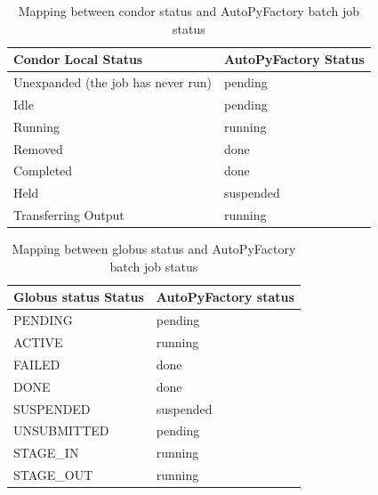 \documentclass[a4paper]{jpconf}
\begin{document}
\begin{table}[h]
   \begin{center}
      \begin{tabular}{l l}
         \hline
         \textbf{Condor Local Status}  & \textbf{AutoPyFactory Status}       \\ 
         \hline
         Unexpanded (the job has never run)    &  pending     \\
         Idle                                  &  pending     \\
         Running                               &  running     \\
         Removed                               &  done        \\
         Completed                             &  done        \\
         Held                                  &  suspended   \\
         Transferring Output                   &  running     \\
         \hline
      \end{tabular}
   \end{center}
   \caption{Mapping between condor status and AutoPyFactory batch job status}
   \label{translation}
\end{table}

\begin{table}[h]
   \begin{center}
      \begin{tabular}{l l}
         \hline
         \textbf{Globus status Status}   & \textbf{AutoPyFactory status}       \\ 
         \hline
         PENDING       &   pending    \\
         ACTIVE        &   running    \\
         FAILED        &   done       \\
         DONE          &   done       \\
         SUSPENDED     &   suspended  \\
         UNSUBMITTED   &   pending    \\
         STAGE\_IN     &   running    \\
         STAGE\_OUT    &   running    \\
         \hline
      \end{tabular}
   \end{center}
   \caption{Mapping between globus status and AutoPyFactory batch job status}
   \label{translation}
\end{table}
\end{document}
